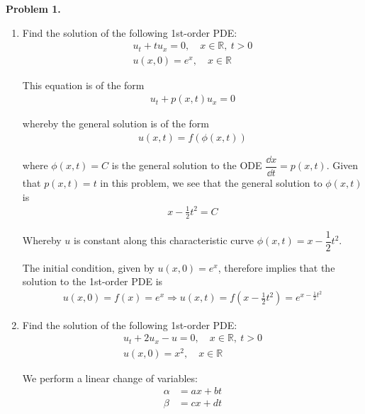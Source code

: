 \textbf{Problem 1.}

\begin{enumerate}[label=(\roman*),leftmargin=*,itemsep=0mm]
    
    \item Find the solution of the following 1st-order PDE:
    \begin{gather*}
        u_t + tu_x = 0,\quad x\in\mathbb{R},\> t>0 \\
        u(x,0) = e^x, \quad x\in\mathbb{R}
    \end{gather*}
    
    This equation is of the form
    \begin{align*}
        u_t + p(x,t) u_x = 0
    \end{align*}
    
    whereby the general solution is of the form
    \begin{align*}
        u(x,t) = f(\phi(x,t))
    \end{align*}
    
    where $\phi(x,t)=C$ is the general solution to the ODE $\dfrac{\dd{x}}{\dd{t}} = p(x,t)$.  Given that $p(x,t) = t$ in this problem, we see that the general solution to $\phi(x,t)$ is
    \begin{align*}
        x - \frac{1}{2}t^2 = C
    \end{align*}
    
    Whereby $u$ is constant along this characteristic curve $\phi(x,t) = x - \dfrac{1}{2}t^2$.
    
    The initial condition, given by $u(x,0) = e^x$, therefore implies that the solution to the 1st-order PDE is
    \begin{align*}
        u(x,0) = f(x) = e^x \Rightarrow u(x,t) = f\left(x-\frac{1}{2}t^2\right) = e^{x-\frac{1}{2}t^2}
    \end{align*}
    
    \item Find the solution of the following 1st-order PDE:
    \begin{gather*}
        u_t + 2u_x - u = 0,\quad x\in\mathbb{R},\> t>0 \\
        u(x,0) = x^2, \quad x\in\mathbb{R}
    \end{gather*}
    
    We perform a linear change of variables:
    \begin{align*}
        \alpha &= ax + bt \\
        \beta  &= cx + dt 
    \end{align*}
    

\end{enumerate}
